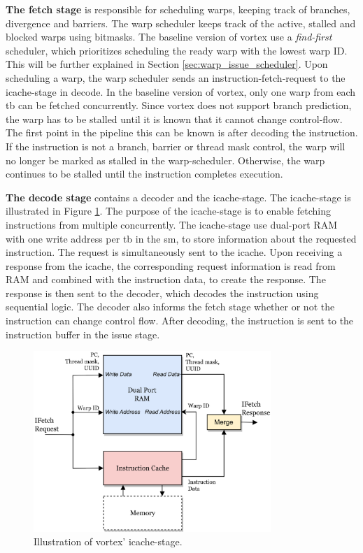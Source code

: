 \vspace{1mm}\noindent
\textbf{The fetch stage} is responsible for scheduling warps, keeping track of branches, divergence and barriers. The warp scheduler keeps track of the active, stalled and blocked warps using bitmasks. The baseline version of \Gls{vortex} use a \textit{find-first} scheduler, which prioritizes scheduling the ready warp with the lowest warp ID. This will be further explained in Section \ref{sec:warp_issue_scheduler}. Upon scheduling a warp, the warp scheduler sends an instruction-fetch-request to the icache-stage in decode. In the baseline version of \Gls{vortex}, only one warp from each \acrshort{tb} can be fetched concurrently. Since vortex does not support branch prediction, the warp has to be stalled until it is known that it cannot change control-flow. The first point in the pipeline this can be known is after decoding the instruction. If the instruction is not a branch, barrier or thread mask control, the warp will no longer be marked as stalled in the warp-scheduler. Otherwise, the warp continues to be stalled until the instruction completes execution.

\noindent
\textbf{The decode stage} contains a decoder and the icache-stage. The icache-stage is illustrated in Figure \ref{fig:baseline_icache_stage}. The purpose of the icache-stage is to enable fetching instructions from multiple  concurrently. The icache-stage use dual-port RAM with one write address per \acrshort{tb} in the \acrshort{sm}, to store information about the requested instruction. The request is simultaneously sent to the icache. Upon receiving a response from the icache, the corresponding request information is read from RAM and combined with the instruction data, to create the response. The response is then sent to the decoder, which decodes the instruction using sequential logic. The decoder also informs the fetch stage whether or not the instruction can change control flow. After decoding, the instruction is sent to the instruction buffer in the issue stage.

\begin{figure}
    \centering
    \includegraphics[width=0.8\textwidth]{figures/Baseline Icache-stage.png}
    \caption{Illustration of \Gls{vortex}' icache-stage.}
    \label{fig:baseline_icache_stage}
\end{figure}

